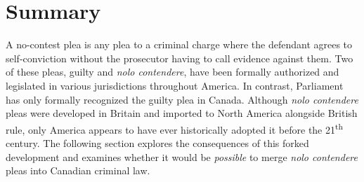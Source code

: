 \section{Summary}

A no-contest plea is any plea to a criminal charge where the defendant agrees to self-conviction without the prosecutor having to call evidence against them. Two of these pleas, guilty and \textit{nolo contendere}, have been formally authorized and legislated in various jurisdictions throughout America. In contrast, Parliament has only formally recognized the guilty plea in Canada. Although \textit{nolo contendere} pleas were developed in Britain and imported to North America alongside British rule, only America appears to have ever historically adopted it before the 21\textsuperscript{th} century. The following section explores the consequences of this forked development and examines whether it would be \textit{possible} to merge \textit{nolo contendere} pleas into Canadian criminal law. 